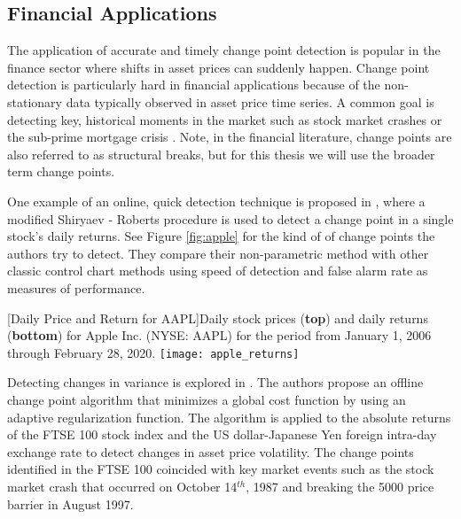 \subsection{Financial Applications}
The application of accurate and timely change point detection is popular in the finance sector where shifts in asset prices can suddenly happen. Change point detection is particularly hard in financial applications because of the non-stationary data typically observed in asset price time series. A common goal is detecting key, historical moments in the market such as stock market crashes \cite{banerjee2020change}  or the sub-prime mortgage crisis \cite{zhu2015change}. Note, in the financial literature, change points  are also referred to as structural breaks, but for this thesis we will use the broader term change points.

One example of an online, quick detection technique is proposed in  \cite{pepelyshev2017real}, where a modified Shiryaev - Roberts procedure is used to detect a change point in a single stock's daily returns. See Figure \ref{fig:apple} for the kind of of change points the authors try to detect. They compare their non-parametric method with other classic control chart methods using speed of detection and false alarm rate as measures of performance.
\begin{center} 
[Daily Price and Return for AAPL]{Daily stock prices (\textbf{top}) and daily returns (\textbf{bottom}) for Apple Inc. (NYSE: AAPL) for the period from January 1, 2006 through February 28, 2020.} 
\texttt{[image: apple\_returns]} 
\label{fig:apple} 
\end{center}

Detecting changes in variance is explored in  \cite{lavielle2007adaptive}. The authors propose an offline change point algorithm that minimizes a global cost function by using an adaptive regularization function. The algorithm is applied to the absolute returns of the FTSE 100 stock index and the US dollar-Japanese Yen foreign intra-day exchange rate to detect changes in asset price volatility. The change points  identified in the FTSE 100 coincided with key market events such as the stock market crash that occurred on October 14$^{th}$, 1987 and breaking the 5000 price barrier in August 1997.


